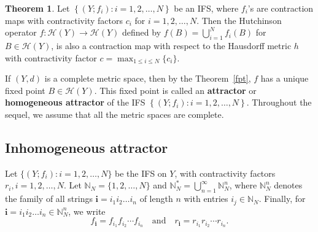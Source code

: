 \documentclass[10pt]{amsart}
\theoremstyle{definition}
\newtheorem{thm}{Theorem}[section]
\begin{document}
	\begin{thm}\cite{FG}
		Let $\left\{(Y;f_i):i=1,2,\ldots,N\right\}$ be an IFS, where $f_i$'s are contraction maps with contractivity factors $c_i$ for $i=1,2,\ldots,N$. Then the Hutchinson operator $f:\mathscr{H}(Y)\rightarrow \mathscr{H}(Y)$ defined by $f(B)=\bigcup_{i=1}^Nf_i(B)$ for $B\in \mathscr{H}(Y)$, is also a contraction map with respect to the Hausdorff metric $h$ with contractivity factor $c=\max_{1\leq i \leq N} \{c_i\}$.
		\label{conth}
	\end{thm}
	If $(Y,d)$ is a complete metric space, then by the Theorem~\ref{fpt}, $f$ has a unique fixed point $B\in\mathscr{H}(Y)$. This fixed point is called an \textbf{attractor} or \textbf{homogeneous attractor} of the IFS $\left\{(Y;f_i):i=1,2,\ldots,N\right\}$. Throughout the sequel, we assume that all the metric spaces are complete.
	
	\subsection{Inhomogeneous attractor}
	\label{rbhainhatt}
	Let $\{(Y;f_i):i=1,2,\ldots,N\}$ be the IFS on $Y$, with contractivity factors $r_i, i=1,2,\ldots,N$. Let $\mathbb{N}_N=\{1,2,\ldots,N\}$ and $\mathbb{N}_N^*=\bigcup_{n=1}^{\infty}\mathbb{N}_N^n$, where $\mathbb{N}_N^n$ denotes the family of all strings $\textbf{i}=i_1i_2\ldots i_n$ of length $n$ with entries $i_j\in \mathbb{N}_N$. Finally, for $\textbf{i}=i_1i_2\ldots i_n\in \mathbb{N}_N^n$, we write
	$$f_{\textbf{i}}=f_{i_1}f_{i_2}\cdots f_{i_n}\quad\mbox{and}\quad r_{\textbf{i}}=r_{i_1}r_{i_2}\cdots r_{i_n}.$$
	
\end{document}
